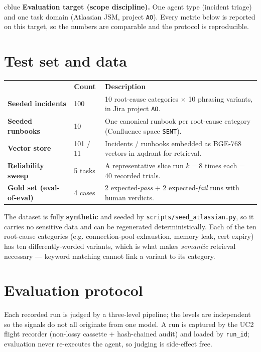 \documentclass[11pt]{article}
\begin{document}
\begin{notebox}{cblue}
\textbf{Evaluation target (scope discipline).} One agent type (incident triage) and one
task domain (Atlassian JSM, project \texttt{AO}). Every metric below is reported on this
target, so the numbers are comparable and the protocol is reproducible.
\end{notebox}

\section{Test set and data}
\begin{tabular}{@{}>{\bfseries}p{4.2cm} p{2.4cm} p{8.4cm}@{}}
\toprule
\rowcolor{headerbg}\multicolumn{1}{@{}>{\bfseries\color{white}}l}{Asset} & \color{white}\bfseries Count & \color{white}\bfseries Description \\
Seeded incidents & 100 & 10 root-cause categories $\times$ 10 phrasing variants, in Jira project \texttt{AO}. \\
Seeded runbooks & 10 & One canonical runbook per root-cause category (Confluence space \texttt{SENT}). \\
Vector store & 101 / 11 & Incidents / runbooks embedded as BGE-768 vectors in xqdrant for retrieval. \\
Reliability sweep & 5 tasks & A representative slice run $k=8$ times each = 40 recorded trials. \\
Gold set (eval-of-eval) & 4 cases & 2 expected-\emph{pass} + 2 expected-\emph{fail} runs with human verdicts. \\
\bottomrule
\end{tabular}

\vspace{4pt}
The dataset is fully \textbf{synthetic} and seeded by \texttt{scripts/seed\_atlassian.py},
so it carries no sensitive data and can be regenerated deterministically. Each of the ten
root-cause categories (e.g. connection-pool exhaustion, memory leak, cert expiry) has ten
differently-worded variants, which is what makes \emph{semantic} retrieval necessary ---
keyword matching cannot link a variant to its category.

\section{Evaluation protocol}
Each recorded run is judged by a three-level pipeline; the levels are independent so the
signals do not all originate from one model. A run is captured by the UC2 flight recorder
(non-lossy cassette + hash-chained audit) and loaded by \texttt{run\_id}; evaluation never
re-executes the agent, so judging is side-effect free.
\end{document}
